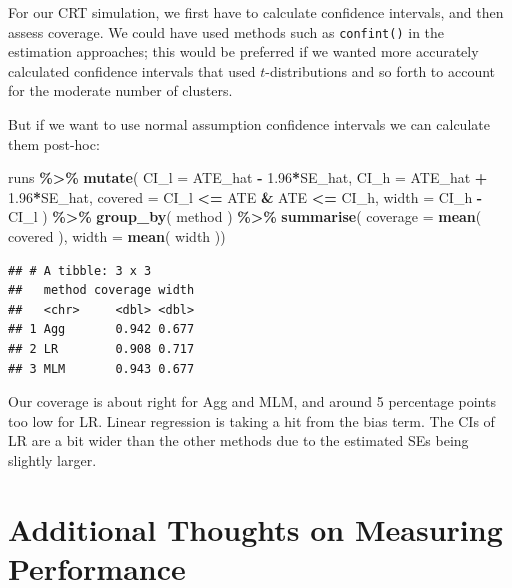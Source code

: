 \documentclass[
]{book}
\newenvironment{Shaded}{\begin{snugshade}}{\end{snugshade}}
\newcommand{\AttributeTok}[1]{\textcolor[rgb]{0.13,0.29,0.53}{#1}}
\newcommand{\FloatTok}[1]{\textcolor[rgb]{0.00,0.00,0.81}{#1}}
\newcommand{\FunctionTok}[1]{\textcolor[rgb]{0.13,0.29,0.53}{\textbf{#1}}}
\newcommand{\NormalTok}[1]{#1}
\newcommand{\SpecialCharTok}[1]{\textcolor[rgb]{0.81,0.36,0.00}{\textbf{#1}}}
\begin{document}
For our CRT simulation, we first have to calculate confidence intervals, and then assess coverage.
We could have used methods such as \texttt{confint()} in the estimation approaches; this would be preferred if we wanted more accurately calculated confidence intervals that used \(t\)-distributions and so forth to account for the moderate number of clusters.

But if we want to use normal assumption confidence intervals we can calculate them post-hoc:

\begin{Shaded}
\begin{Highlighting}[]
\NormalTok{runs }\SpecialCharTok{\%\textgreater{}\%} \FunctionTok{mutate}\NormalTok{( }\AttributeTok{CI\_l =}\NormalTok{ ATE\_hat }\SpecialCharTok{{-}} \FloatTok{1.96}\SpecialCharTok{*}\NormalTok{SE\_hat,}
                 \AttributeTok{CI\_h =}\NormalTok{ ATE\_hat }\SpecialCharTok{+} \FloatTok{1.96}\SpecialCharTok{*}\NormalTok{SE\_hat,}
                 \AttributeTok{covered =}\NormalTok{ CI\_l }\SpecialCharTok{\textless{}=}\NormalTok{ ATE }\SpecialCharTok{\&}\NormalTok{ ATE }\SpecialCharTok{\textless{}=}\NormalTok{ CI\_h,}
                 \AttributeTok{width =}\NormalTok{ CI\_h }\SpecialCharTok{{-}}\NormalTok{ CI\_l ) }\SpecialCharTok{\%\textgreater{}\%}
  \FunctionTok{group\_by}\NormalTok{( method ) }\SpecialCharTok{\%\textgreater{}\%}
  \FunctionTok{summarise}\NormalTok{( }\AttributeTok{coverage =} \FunctionTok{mean}\NormalTok{( covered ),}
             \AttributeTok{width =} \FunctionTok{mean}\NormalTok{( width ))}
\end{Highlighting}
\end{Shaded}

\begin{verbatim}
## # A tibble: 3 x 3
##   method coverage width
##   <chr>     <dbl> <dbl>
## 1 Agg       0.942 0.677
## 2 LR        0.908 0.717
## 3 MLM       0.943 0.677
\end{verbatim}

Our coverage is about right for Agg and MLM, and around 5 percentage points too low for LR.
Linear regression is taking a hit from the bias term.
The CIs of LR are a bit wider than the other methods due to the estimated SEs being slightly larger.

\section{Additional Thoughts on Measuring Performance}\label{additional-thoughts-on-measuring-performance}
\end{document}
